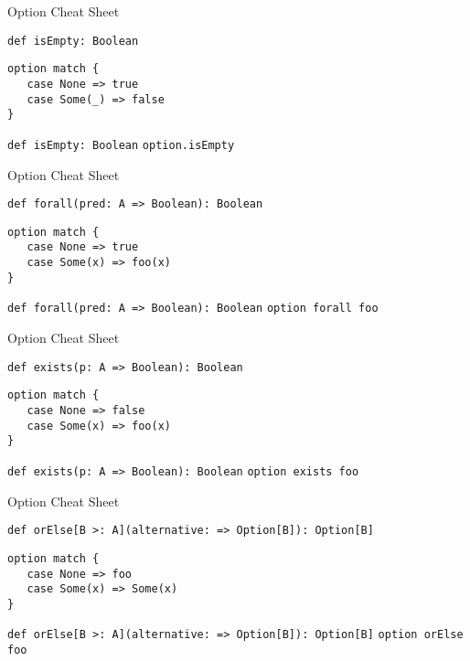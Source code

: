 \begin{frame}[fragile]{Option Cheat Sheet}
\begin{alertblock}{\lstinline!def isEmpty: Boolean!}
\begin{lstlisting}
option match {
   case None => true
   case Some(_) => false
}
\end{lstlisting}
\end{alertblock}
\begin{exampleblock}{\lstinline!def isEmpty: Boolean!}
\lstinline!option.isEmpty!
\end{exampleblock}
\end{frame}

\begin{frame}[fragile]{Option Cheat Sheet}
\begin{alertblock}{\lstinline!def forall(pred: A => Boolean): Boolean!}
\begin{lstlisting}
option match {
   case None => true
   case Some(x) => foo(x)
}
\end{lstlisting}
\end{alertblock}
\begin{exampleblock}{\lstinline!def forall(pred: A => Boolean): Boolean!}
\lstinline!option forall foo!
\end{exampleblock}
\end{frame}

\begin{frame}[fragile]{Option Cheat Sheet}
\begin{alertblock}{\lstinline!def exists(p: A => Boolean): Boolean!}
\begin{lstlisting}
option match {
   case None => false
   case Some(x) => foo(x)
}
\end{lstlisting}
\end{alertblock}
\begin{exampleblock}{\lstinline!def exists(p: A => Boolean): Boolean!}
\lstinline!option exists foo!
\end{exampleblock}
\end{frame}

\begin{frame}[fragile]{Option Cheat Sheet}
\begin{alertblock}{\lstinline!def orElse[B >: A](alternative: => Option[B]): Option[B]!}
\begin{lstlisting}
option match {
   case None => foo
   case Some(x) => Some(x)
}
\end{lstlisting}
\end{alertblock}
\begin{exampleblock}{\lstinline!def orElse[B >: A](alternative: => Option[B]): Option[B]!}
\lstinline!option orElse foo!
\end{exampleblock}
\end{frame}


